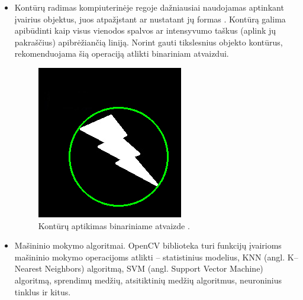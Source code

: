 \documentclass[a4paper,12pt]{article}
\begin{document}
\begin{itemize}
	\item Kontūrų radimas kompiuterinėje regoje dažniausiai naudojamas aptinkant įvairius objektus, juos atpažįstant ar nustatant jų formas \cite{CONTOURS}. Kontūrą galima apibūdinti kaip visus vienodos spalvos ar intensyvumo taškus (aplink jų pakraščius) apibrėžiančią liniją. Norint gauti tikslesnius objekto kontūrus, rekomenduojama šią operaciją atlikti binariniam atvaizdui.
	\begin{figure}[H]
		\centering
		\includegraphics[scale=0.3]{images/contours}
		\caption{Kontūrų aptikimas binariniame atvaizde \cite{CONTOURS}.}   %
		\label{img:contours}
	\end{figure} 
	
	\item Mašininio mokymo algoritmai. OpenCV biblioteka turi funkcijų įvairioms mašininio mokymo operacijoms atlikti – statistinius modelius, KNN (angl. K–Nearest Neighbors) algoritmą, SVM (angl. Support Vector Machine) algoritmą, sprendimų medžių, atsitiktinių medžių algoritmus, neuroninius tinklus ir kitus.
	

\end{itemize}
\end{document}
